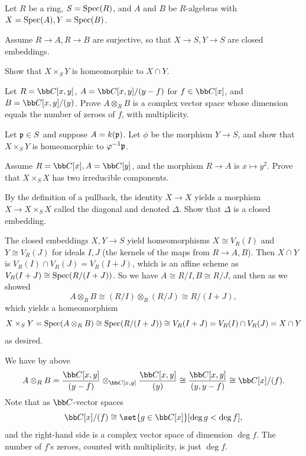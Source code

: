 \bprob

    Let $R$ be a ring, $S={\rm Spec}(R)$, and $A$ and $B$ be $R$-algebras with $X={\rm Spec}(A),Y={\rm Spec}(B)$.
    \benum
        \item Assume $R\to A,R\to B$ are surjective, so that $X\to S,Y\to S$ are closed embeddings.
        \benum
            \item Show that $X\times_SY$ is homeomorphic to $X\cap Y$.
            \item Let $R=\bC[x,y]$, $A=\bC[x,y]/(y-f)$ for $f\in\bC[x]$, and $B=\bC[x,y]/(y)$.
            Prove $A\otimes_RB$ is a complex vector space whose dimension equals the number of zeroes of $f$, with multiplicity.
        \eenum
        \item Let ${{\frak p}}\in S$ and suppose $A=k({{\frak p}})$.
        Let $\phi$ be the morphism $Y\to S$, and show that $X\times_SY$ is homeomorphic to $\varphi^{-1}{{\frak p}}$.
        \item Assume $R=\bC[x],A=\bC[y]$, and the morphism $R\to A$ is $x\mapsto y^2$.
        Prove that $X\times_SX$ has two irreducible components.
        \item By the definition of a pullback, the identity $X\to X$ yields a morphism $X\to X\times_SX$ called the {\emphcolor diagonal}
        and denoted $\Delta$.
        Show that $\Delta$ is a closed embedding.
    \eenum

\eprob

\benum
    \item
    \benum
        \item The closed embeddings $X,Y\to S$ yield homeomorphisms $X\cong V_R(I)$ and $Y\cong V_R(J)$ for ideals $I,J$ (the kernels of the maps
        from $R\to A,B$).
        Then $X\cap Y$ is $V_R(I)\cap V_R(J)=V_R(I+J)$, which is an affine scheme as $V_R(I+J)\cong{\rm Spec}(R/(I+J))$.
        So we have $A\cong R/I,B\cong R/J$, and then as we showed
        $$ A\otimes_RB \cong (R/I)\otimes_R(R/J) \cong R/(I+J) , $$
        which yields a homeomorphism
        $$ X\times_SY = {\rm Spec}(A\otimes_RB) \cong {\rm Spec}(R/(I+J)) \cong V_R(I+J) = V_R(I)\cap V_R(J) = X\cap Y $$
        as desired.

        \item We have by above
        $$ A\otimes_RB = \frac{\bC[x,y]}{(y-f)} \otimes_{\bC[x,y]} \frac{\bC[x,y]}{(y)} \cong \frac{\bC[x,y]}{(y,y-f)} \cong \bC[x]/(f). $$
        Note that as $\bC$-vector spaces
        $$ \bC[x]/(f) \cong \set{g\in\bC[x]}[\deg g<\deg f] , $$
        and the right-hand side is a complex vector space of dimension $\deg f$.
        The number of $f$'s zeroes, counted with multiplicity, is just $\deg f$.
    \eenum

